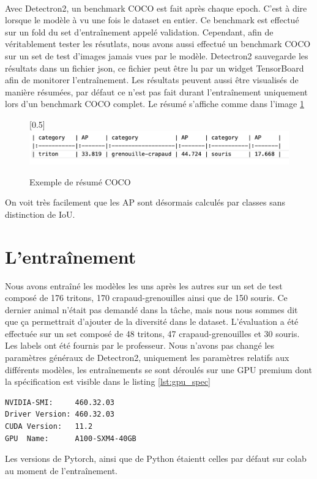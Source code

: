 \paragraph{}
Avec Detectron2, un benchmark COCO est fait après chaque epoch. C'est à dire lorsque le modèle à vu une fois le dataset en entier. Ce benchmark est effectué sur un fold du set d'entraînement appelé validation. Cependant, afin de véritablement tester les résutlats, nous avons aussi effectué un benchmark COCO sur un set de test d'images jamais vues par le modèle. 
Detectron2 sauvegarde les résultats dans un fichier json, ce fichier peut être lu par un widget TensorBoard afin de monitorer l'entraînement.
Les résultats peuvent aussi être visualisés de manière résumées, par défaut ce n'est pas fait durant l'entraînement uniquement lors d'un benchmark COCO complet. Le résumé s'affiche comme dans l'image \ref{fig:eval_coco_benchmark_resume} 
\begin{figure}
    \centering
    \scalebox{0.5}[0.5]{\includegraphics[width=\textwidth]{images/eval_coco_benchmark_resume.png}}
    \caption{Exemple de résumé COCO}
    \label{fig:eval_coco_benchmark_resume}
\end{figure}
On voit très facilement que les AP sont désormais calculés par classes sans distinction de IoU. 

\section{L'entraînement}\label{anal:train}
Nous avons entraîné les modèles les uns après les autres sur un set de test composé de 176 tritons, 170 crapaud-grenouilles ainsi que de 150 souris. Ce dernier animal n'était pas demandé dans la tâche, mais nous nous sommes dit que ça permettrait d'ajouter de la diversité dans le dataset.
L'évaluation a été effectuée sur un set composé de 48 tritons, 47 crapaud-grenouilles et 30 souris. Les labels ont été fournis par le professeur.
Nous n'avons pas changé les paramètres généraux de Detectron2, uniquement les paramètres relatifs aux différents modèles, les entraînements se sont déroulés sur une GPU premium dont la spécification est visible dans le listing \ref{lst:gpu_spec}
\lstset{style=Bash}
\begin{lstlisting}[caption = {Résultat de la commande nvidia-smi},label={lst:gpu_spec}]
NVIDIA-SMI:     460.32.03    
Driver Version: 460.32.03    
CUDA Version:   11.2     
GPU  Name:      A100-SXM4-40GB
\end{lstlisting}
Les versions de Pytorch, ainsi que de Python étaientt celles par défaut sur colab au moment de l'entraînement.

